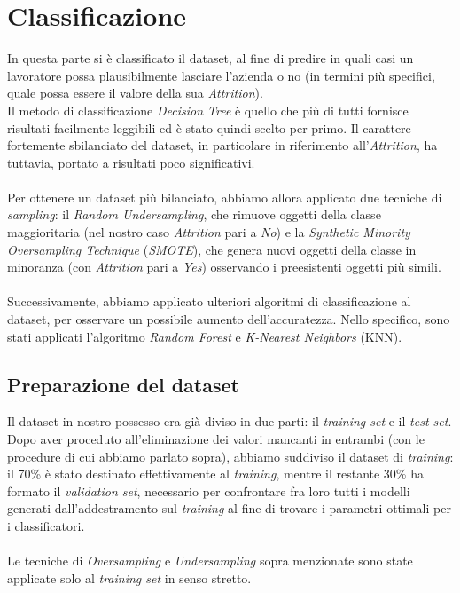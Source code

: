\section{Classificazione}
In questa parte si è classificato il dataset, al fine di predire in quali casi un lavoratore possa plausibilmente lasciare l’azienda o no (in termini più specifici, quale possa essere il valore della sua \textit{Attrition}). \\
Il metodo di classificazione \textit{Decision Tree} è quello che più di tutti fornisce risultati facilmente leggibili ed è stato quindi scelto per primo. Il carattere fortemente sbilanciato del dataset, in particolare in riferimento all’\textit{Attrition}, ha tuttavia, portato a risultati poco significativi. \\\\
Per ottenere un dataset più bilanciato, abbiamo allora applicato due tecniche di \textit{sampling}: il \textit{Random Undersampling}, che rimuove oggetti della classe maggioritaria (nel nostro caso \textit{Attrition} pari a \textit{No}) e la \textit{Synthetic Minority Oversampling Technique} (\textit{SMOTE}), che genera nuovi oggetti della classe in minoranza (con \textit{Attrition} pari a \textit{Yes}) osservando i preesistenti oggetti più simili.\\\\
Successivamente, abbiamo applicato ulteriori algoritmi di classificazione al dataset, per osservare un possibile aumento dell’accuratezza. Nello specifico, sono stati applicati l’algoritmo \textit{Random Forest} e\textit{ K-Nearest Neighbors} (KNN).

\subsection{Preparazione del dataset}
Il dataset in nostro possesso era già diviso in due parti: il \textit{training set} e il \textit{test set}. Dopo aver proceduto all’eliminazione dei valori mancanti in entrambi (con le procedure di cui abbiamo parlato sopra), abbiamo suddiviso il dataset di \textit{training}: il 70\% è stato destinato effettivamente al \textit{training}, mentre il restante 30\% ha formato il \textit{validation set}, necessario per confrontare fra loro tutti i modelli generati dall’addestramento sul \textit{training} al fine di trovare i parametri ottimali per i classificatori. \\\\Le tecniche di \textit{Oversampling} e \textit{Undersampling} sopra menzionate sono state applicate solo al \textit{training set }in senso stretto.

